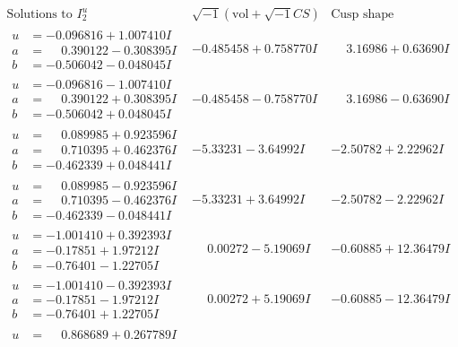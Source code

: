 \documentclass[1p]{elsarticle_modified}
\theoremstyle{definition}
\newcommand{\I}{\sqrt{-1}}
\begin{document}
$$\begin{array}{c|c|c}  
\text{Solutions to }I^u_{2}& \I (\text{vol} + \sqrt{-1}CS) & \text{Cusp shape}\\
 \hline 
\begin{aligned}
u &= -0.096816 + 1.007410 I \\
a &= \phantom{-}0.390122 - 0.308395 I \\
b &= -0.506042 - 0.048045 I\end{aligned}
 & -0.485458 + 0.758770 I & \phantom{-}3.16986 + 0.63690 I \\ \hline\begin{aligned}
u &= -0.096816 - 1.007410 I \\
a &= \phantom{-}0.390122 + 0.308395 I \\
b &= -0.506042 + 0.048045 I\end{aligned}
 & -0.485458 - 0.758770 I & \phantom{-}3.16986 - 0.63690 I \\ \hline\begin{aligned}
u &= \phantom{-}0.089985 + 0.923596 I \\
a &= \phantom{-}0.710395 + 0.462376 I \\
b &= -0.462339 + 0.048441 I\end{aligned}
 & -5.33231 - 3.64992 I & -2.50782 + 2.22962 I \\ \hline\begin{aligned}
u &= \phantom{-}0.089985 - 0.923596 I \\
a &= \phantom{-}0.710395 - 0.462376 I \\
b &= -0.462339 - 0.048441 I\end{aligned}
 & -5.33231 + 3.64992 I & -2.50782 - 2.22962 I \\ \hline\begin{aligned}
u &= -1.001410 + 0.392393 I \\
a &= -0.17851 + 1.97212 I \\
b &= -0.76401 - 1.22705 I\end{aligned}
 & \phantom{-}0.00272 - 5.19069 I & -0.60885 + 12.36479 I \\ \hline\begin{aligned}
u &= -1.001410 - 0.392393 I \\
a &= -0.17851 - 1.97212 I \\
b &= -0.76401 + 1.22705 I\end{aligned}
 & \phantom{-}0.00272 + 5.19069 I & -0.60885 - 12.36479 I \\ \hline\begin{aligned}
u &= \phantom{-}0.868689 + 0.267789 I \\

\end{aligned}
\end{array}$$
\end{document}

